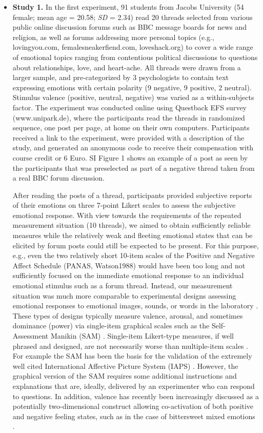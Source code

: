 \documentclass[nologo,url,11pt,a4paper]{ETHpaper}
\begin{document}
\begin{itemize} 

\item \textbf{Study 1.}  
In the first experiment, 91 students from Jacobs University (54 female; mean age = 20.58; \textit{SD} = 2.34) read 20 threads  selected from various public online discussion forums such as BBC message boards for news and religion, as well as forums addressing more personal topics (e.g., lovingyou.com, femalesneakerfiend.com, loveshack.org) to cover a wide range of emotional topics ranging from contentious political discussions to questions about relationships, love, and heart-ache. All threads were drawn from a larger sample, and pre-categorized by 3 psychologists to contain text expressing emotions with certain polarity  (9 negative, 9 positive, 2 neutral). Stimulus valence (positive, neutral, negative) was varied as a within-subjects factor. The experiment was conducted online using Questback EFS survey (www.unipark.de), where the participants read the threads in randomized sequence, one post per page, at home on their own computers. Participants received a link to the experiment, were provided with a description of the study, and  generated an anonymous code to receive their compensation with course credit or 6 Euro. 
SI Figure 1 shows an example of a post as seen by the participants that was preselected as part of a negative thread taken from a real BBC forum discussion. 

After reading the posts of a thread, participants provided subjective reports of their emotions on three 7-point Likert scales to assess the subjective emotional response. With view towards the requirements of the repeated measurement situation (10 threads), we aimed to obtain sufficiently reliable measures while the relatively weak and fleeting emotional states that can be elicited by forum posts could still be expected to be present. For this purpose, e.g., even the two relatively short 10-item scales of the Positive and Negative Affect Schedule (PANAS, {Watson1988}) would have been too long and not sufficiently focused on the immediate emotional response to an individual emotional stimulus such as a forum thread. Instead, our measurement situation was much more comparable to experimental designs assessing emotional responses to emotional images, sounds, or words in the laboratory \cite{Lang1993,Larsen2003}. These types of designs typically measure valence, arousal, and sometimes dominance (power) via single-item graphical scales such as the Self-Assessment Manikin (SAM) \cite{Bradley1994}. Single-item Likert-type measures, if well phrased and designed, are not necessarily worse than multiple-item scales \cite{Gardner1998}. For example the SAM has been the basis for the validation of the extremely well cited International Affective Picture System (IAPS) \cite{Lang2008}. However, the graphical version of the SAM requires some additional instructions and explanations that are, ideally, delivered by an experimenter who can respond to questions. In addition, valence has recently been increasingly discussed as a potentially two-dimensional construct allowing co-activation of both positive and negative feeling states, such as in the case of bittersweet mixed emotions \cite{Larsen2011}. 


\end{itemize}
\end{document}
